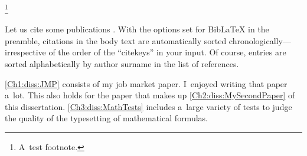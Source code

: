 



\blindtext[1]%
\unskip\unskip\unskip\unskip\footnote{A~test footnote.}

\knutext

Let us cite some publications \citep{Andersen2008, Andreoni2012, Balakrishnan2016, Koszegi2013, Bursztyn2025}. With the options set for BibLaTeX in the preamble, citations in the body text are automatically sorted chronologically---irrespective of the order of the ``citekeys'' in your input. Of course, entries are sorted alphabetically by author surname in the list of references.

%

\Blindtext

\autoref{Ch1:diss:JMP} consists of my job market paper. I~enjoyed writing that paper a~lot. This also holds for the paper that makes up \autoref{Ch2:diss:MySecondPaper} of this dissertation. \autoref{Ch3:diss:MathTests} includes a~large variety of tests to judge the quality of the typesetting of mathematical formulas.
